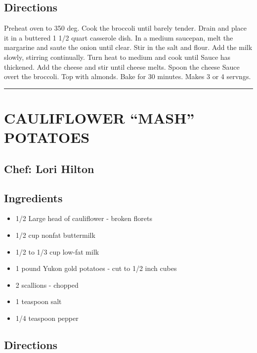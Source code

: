 \documentclass[
]{book}
\providecommand{\tightlist}{%
  \setlength{\itemsep}{0pt}\setlength{\parskip}{0pt}}
\begin{document}
\hypertarget{directions-27}{%
\subsection*{Directions}\label{directions-27}}


Preheat oven to 350 deg. Cook the broccoli until barely tender. Drain and
place it in a buttered 1 1/2 quart casserole dish. In a medium saucepan, melt
the margarine and saute the onion until clear. Stir in the salt and flour.
Add the milk slowly, stirring continually. Turn heat to medium and cook until
Sauce has thickened. Add the cheese and stir until cheese melts. Spoon the cheese
Sauce overt the broccoli. Top with almonds. Bake for 30 minutes. Makes 3 or 4 servngs.

\begin{center}\rule{0.5\linewidth}{0.5pt}\end{center}

\hypertarget{cauliflower-mash-potatoes}{%
\section*{CAULIFLOWER ``MASH'' POTATOES}\label{cauliflower-mash-potatoes}}


\hypertarget{chef-lori-hilton-2}{%
\subsection*{Chef: Lori Hilton}\label{chef-lori-hilton-2}}


\hypertarget{ingredients-28}{%
\subsection*{Ingredients}\label{ingredients-28}}


\begin{itemize}
\tightlist
\item
  1/2 Large head of cauliflower - broken florets
\item
  1/2 cup nonfat buttermilk
\item
  1/2 to 1/3 cup low-fat milk
\item
  1 pound Yukon gold potatoes - cut to 1/2 inch cubes
\item
  2 scallions - chopped
\item
  1 teaspoon salt
\item
  1/4 teaspoon pepper
\end{itemize}

\hypertarget{directions-28}{%
\subsection*{Directions}\label{directions-28}}
\end{document}
